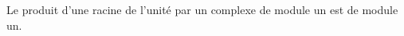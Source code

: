 Le produit d'une racine de l'unité par un complexe de module un est de module un.

\begin{reponses}
\end{reponses}

